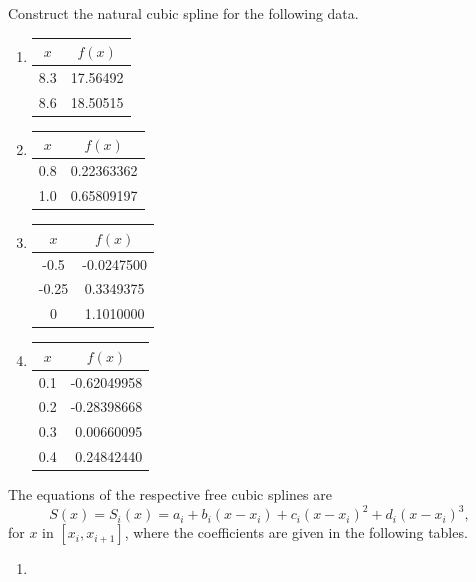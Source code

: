\begin{posttest}
\item Construct the natural cubic spline for the following data.
\begin{enumerate}[label=(\alph*)]
\item
\begin{center}
\begin{tabular}{c|c}
$x$ & $f(x)$ \\
\hline
8.3 & 17.56492 \\
8.6 & 18.50515 \\
\end{tabular}
\end{center}
\item
\begin{center}
\begin{tabular}{c|c}
$x$ & $f(x)$ \\
\hline
0.8 & 0.22363362 \\
1.0 & 0.65809197 \\
\end{tabular}
\end{center}
\item
\begin{center}
\begin{tabular}{c|c}
\multicolumn{1}{c|}{$x$} & $f(x)$ \\
\hline
-0.5 & -0.0247500 \\
-0.25 & 0.3349375 \\
0 & 1.1010000 \\
\end{tabular}
\end{center}
\item
\begin{center}
\begin{tabular}{c|r}
$x$ & \multicolumn{1}{|c}{$f(x)$} \\
\hline
0.1 & -0.62049958 \\
0.2 & -0.28398668 \\
0.3 & 0.00660095 \\
0.4 & 0.24842440 \\
\end{tabular}
\end{center}
\end{enumerate}
\begin{mysolution}
The equations of the respective free cubic splines are
\[S(x)=S_i(x)=a_i+b_i(x-x_i)+c_i(x-x_i)^2+d_i(x-x_i)^3,\]
for $x$ in $[x_i, x_{i+1}]$, where the coefficients are given in the following tables.
\begin{enumerate}[label=(\alph*)]
\item ~

\end{enumerate}
\end{mysolution}
\end{posttest}
